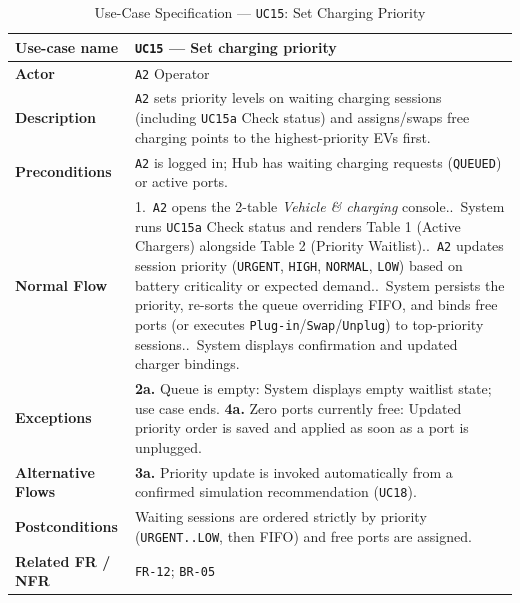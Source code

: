 \begin{table}[H]
  \centering
  \singlespacing\footnotesize
  \caption{Use-Case Specification --- \texttt{UC15}: Set Charging Priority}
  \label{tab:uc15}
  \renewcommand{\arraystretch}{1.13}
  \begin{tabularx}{\textwidth}{|L{2.9cm}|Y|}
    \hline
    \textbf{Use-case name} & \textbf{\texttt{UC15} --- Set charging priority} \\
    \hline
    \textbf{Actor} & \texttt{A2} Operator \\
    \hline
    \textbf{Description} & \texttt{A2} sets priority levels on waiting charging sessions (including \texttt{UC15a} Check status) and assigns/swaps free charging points to the highest-priority EVs first. \\
    \hline
    \textbf{Preconditions} & \texttt{A2} is logged in; Hub has waiting charging requests (\texttt{QUEUED}) or active ports. \\
    \hline
    \textbf{Normal Flow} & 1.\ \texttt{A2} opens the 2-table \textit{Vehicle \& charging} console..\ System runs \texttt{UC15a} Check status and renders Table 1 (Active Chargers) alongside Table 2 (Priority Waitlist)..\ \texttt{A2} updates session priority (\texttt{URGENT}, \texttt{HIGH}, \texttt{NORMAL}, \texttt{LOW}) based on battery criticality or expected demand..\ System persists the priority, re-sorts the queue overriding FIFO, and binds free ports (or executes \texttt{Plug-in}/\texttt{Swap}/\texttt{Unplug}) to top-priority sessions..\ System displays confirmation and updated charger bindings. \\
    \hline
    \textbf{Exceptions} & \textbf{2a.} Queue is empty: System displays empty waitlist state; use case ends.\newline
    \textbf{4a.} Zero ports currently free: Updated priority order is saved and applied as soon as a port is unplugged. \\
    \hline
    \textbf{Alternative Flows} & \textbf{3a.} Priority update is invoked automatically from a confirmed simulation recommendation (\texttt{UC18}). \\
    \hline
    \textbf{Postconditions} & Waiting sessions are ordered strictly by priority (\texttt{URGENT..LOW}, then FIFO) and free ports are assigned. \\
    \hline
    \textbf{Related FR / NFR} & \texttt{FR-12}; \texttt{BR-05} \\
    \hline
  \end{tabularx}
\end{table}

